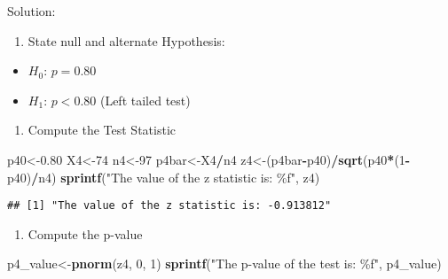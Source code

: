 \documentclass[
]{article}
\newenvironment{Shaded}{\begin{snugshade}}{\end{snugshade}}
\newcommand{\DecValTok}[1]{\textcolor[rgb]{0.00,0.00,0.81}{#1}}
\newcommand{\FloatTok}[1]{\textcolor[rgb]{0.00,0.00,0.81}{#1}}
\newcommand{\FunctionTok}[1]{\textcolor[rgb]{0.13,0.29,0.53}{\textbf{#1}}}
\newcommand{\NormalTok}[1]{#1}
\newcommand{\OtherTok}[1]{\textcolor[rgb]{0.56,0.35,0.01}{#1}}
\newcommand{\SpecialCharTok}[1]{\textcolor[rgb]{0.81,0.36,0.00}{\textbf{#1}}}
\newcommand{\StringTok}[1]{\textcolor[rgb]{0.31,0.60,0.02}{#1}}
\providecommand{\tightlist}{%
  \setlength{\itemsep}{0pt}\setlength{\parskip}{0pt}}
\begin{document}
Solution:

\begin{enumerate}
\def\labelenumi{\arabic{enumi}.}
\tightlist
\item
  State null and alternate Hypothesis:
\end{enumerate}

\begin{itemize}
\tightlist
\item
  \(H_{0}\): \(p=0.80\)
\item
  \(H_{1}\): \(p<0.80\) (Left tailed test)
\end{itemize}

\begin{enumerate}
\def\labelenumi{\arabic{enumi}.}
\setcounter{enumi}{1}
\tightlist
\item
  Compute the Test Statistic
\end{enumerate}

\begin{Shaded}
\begin{Highlighting}[]
\NormalTok{p40}\OtherTok{\textless{}{-}}\FloatTok{0.80}
\NormalTok{X4}\OtherTok{\textless{}{-}}\DecValTok{74}
\NormalTok{n4}\OtherTok{\textless{}{-}}\DecValTok{97}
\NormalTok{p4bar}\OtherTok{\textless{}{-}}\NormalTok{X4}\SpecialCharTok{/}\NormalTok{n4}
\NormalTok{z4}\OtherTok{\textless{}{-}}\NormalTok{(p4bar}\SpecialCharTok{{-}}\NormalTok{p40)}\SpecialCharTok{/}\FunctionTok{sqrt}\NormalTok{(p40}\SpecialCharTok{*}\NormalTok{(}\DecValTok{1}\SpecialCharTok{{-}}\NormalTok{p40)}\SpecialCharTok{/}\NormalTok{n4)}
\FunctionTok{sprintf}\NormalTok{(}\StringTok{"The value of the z statistic is: \%f"}\NormalTok{, z4)}
\end{Highlighting}
\end{Shaded}

\begin{verbatim}
## [1] "The value of the z statistic is: -0.913812"
\end{verbatim}

\begin{enumerate}
\def\labelenumi{\arabic{enumi}.}
\setcounter{enumi}{2}
\tightlist
\item
  Compute the p-value
\end{enumerate}

\begin{Shaded}
\begin{Highlighting}[]
\NormalTok{p4\_value}\OtherTok{\textless{}{-}}\FunctionTok{pnorm}\NormalTok{(z4, }\DecValTok{0}\NormalTok{, }\DecValTok{1}\NormalTok{)}
\FunctionTok{sprintf}\NormalTok{(}\StringTok{"The p{-}value of the test is: \%f"}\NormalTok{, p4\_value)}
\end{Highlighting}
\end{Shaded}
\end{document}
